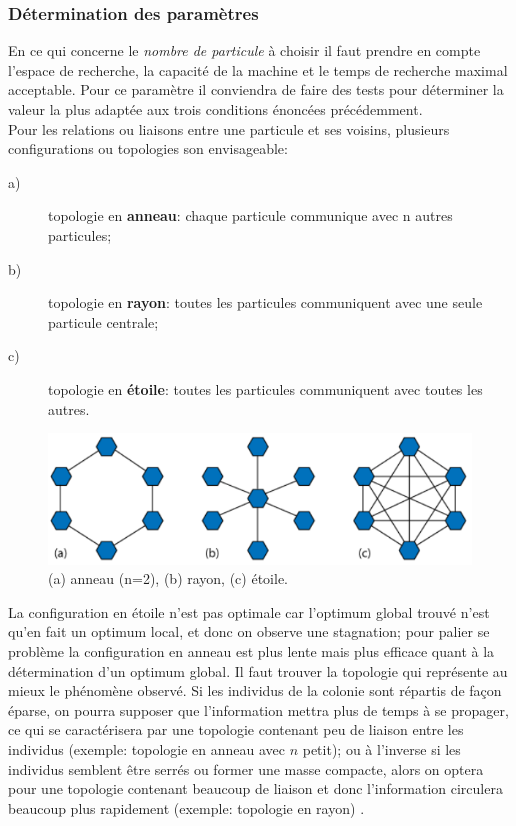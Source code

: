 \documentclass[12pt]{article}
\begin{document}
    \subsubsection{ Détermination des paramètres }
    En ce qui concerne le \textit{nombre de particule} à choisir il faut prendre en compte l'espace de recherche, la capacité de la machine et le temps de recherche maximal acceptable. Pour ce paramètre il conviendra de faire des tests pour déterminer la valeur la plus adaptée aux trois conditions énoncées précédemment. \\
    \indent Pour les relations ou liaisons entre une particule et ses voisins, plusieurs configurations ou topologies son envisageable:
    \begin{description}
    	\item[a)] topologie en \textbf{anneau}: chaque particule communique avec n autres particules;
        \item[b)] topologie en \textbf{rayon}: toutes les particules communiquent avec une seule particule centrale;
        \item[c)] topologie en \textbf{étoile}: toutes les particules communiquent avec toutes les autres.
    \end{description}
    \begin{figure}[H]
        \centering\includegraphics[scale=0.4]{topologies.png}
        \caption{ (a) anneau (n=2), (b) rayon, (c) étoile.}
    \end{figure}
    \indent La configuration en étoile n'est pas optimale car l'optimum global trouvé n'est qu'en fait un optimum local, et donc on observe une stagnation; pour palier se problème la configuration en anneau est plus lente mais plus efficace quant à la détermination d'un optimum global. Il faut trouver la topologie qui représente au mieux le phénomène observé. Si les individus de la colonie sont répartis de façon éparse, on pourra supposer que l'information mettra plus de temps à se propager, ce qui se caractérisera par une topologie contenant peu de liaison entre les individus (exemple: topologie en anneau avec $n$ petit); ou à l'inverse si les individus semblent être serrés ou former une masse compacte, alors on optera pour une topologie contenant beaucoup de liaison et donc l'information circulera beaucoup plus rapidement (exemple: topologie en rayon) \cite{essaim2}. \\
\end{document}
